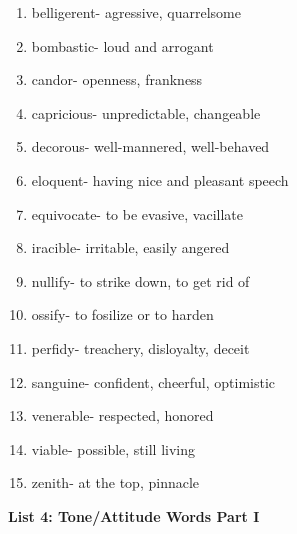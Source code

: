 \begin{enumerate}

\item belligerent- agressive, quarrelsome 

\item bombastic- loud and arrogant

\item candor- openness, frankness

\item capricious- unpredictable, changeable

\item decorous- well-mannered, well-behaved

\item eloquent- having nice and pleasant speech

\item equivocate- to be evasive, vacillate

\item iracible- irritable, easily angered

\item nullify- to strike down, to get rid of

\item ossify- to fosilize or to harden

\item perfidy- treachery, disloyalty, deceit

\item sanguine- confident, cheerful, optimistic

\item venerable- respected, honored

\item viable- possible, still living

\item zenith- at the top, pinnacle

\end{enumerate}


\textbf{List 4: Tone/Attitude Words Part I}

